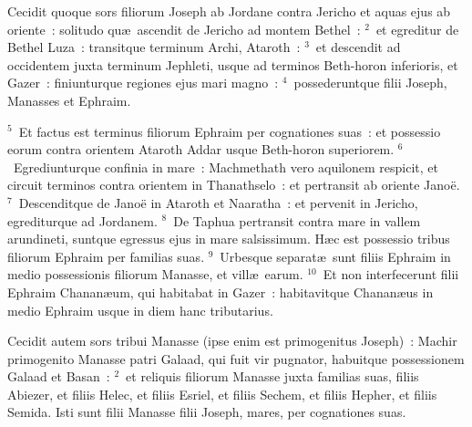 \lettrine[lines=3,image=true,loversize=0.05,lraise=-0.03]{C}{}ecidit quoque sors filiorum Joseph ab Jordane contra Jericho et aquas ejus ab oriente~: solitudo qu\ae\ ascendit de Jericho ad montem Bethel~:
${}^{2}$~et egreditur de Bethel Luza~: transitque terminum Archi, Ataroth~:
${}^{3}$~et descendit ad occidentem juxta terminum Jephleti, usque ad terminos Beth-horon inferioris, et Gazer~: finiunturque regiones ejus mari magno~:
${}^{4}$~possederuntque filii Joseph, Manasses et Ephraim.


${}^{5}$~Et factus est terminus filiorum Ephraim per cognationes suas~: et possessio eorum contra orientem Ataroth Addar usque Beth-horon superiorem.
${}^{6}$~Egrediunturque confinia in mare~: Machmethath vero aquilonem respicit, et circuit terminos contra orientem in Thanathselo~: et pertransit ab oriente Jano\"e.
${}^{7}$~Descenditque de Jano\"e in Ataroth et Naaratha~: et pervenit in Jericho, egrediturque ad Jordanem.
${}^{8}$~De Taphua pertransit contra mare in vallem arundineti, suntque egressus ejus in mare salsissimum. H\ae c est possessio tribus filiorum Ephraim per familias suas.
${}^{9}$~Urbesque separat\ae\ sunt filiis Ephraim in medio possessionis filiorum Manasse, et vill\ae\ earum.
${}^{10}$~Et non interfecerunt filii Ephraim Chanan\ae um, qui habitabat in Gazer~: habitavitque Chanan\ae us in medio Ephraim usque in diem hanc tributarius.

\lettrine[lines=3,image=true,loversize=0.05,lraise=-0.03]{C}{}ecidit autem sors tribui Manasse (ipse enim est primogenitus Joseph)~: Machir primogenito Manasse patri Galaad, qui fuit vir pugnator, habuitque possessionem Galaad et Basan~:
${}^{2}$~et reliquis filiorum Manasse juxta familias suas, filiis Abiezer, et filiis Helec, et filiis Esriel, et filiis Sechem, et filiis Hepher, et filiis Semida. Isti sunt filii Manasse filii Joseph, mares, per cognationes suas.


